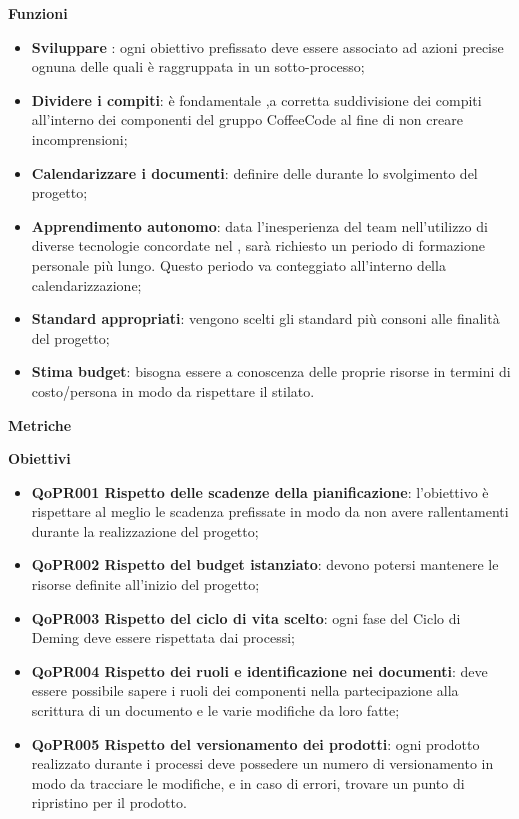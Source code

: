 \documentclass[../piano-di-qualifica.tex]{subfiles}
\begin{document}
\textbf{Funzioni}

\begin{itemize}
    \item \textbf{Sviluppare }: ogni obiettivo prefissato deve essere associato ad azioni precise ognuna delle quali è raggruppata in un sotto-processo;
    \item \textbf{Dividere i compiti}: è fondamentale ,a corretta suddivisione dei compiti all'interno dei componenti del gruppo CoffeeCode al fine di non creare incomprensioni;
    \item \textbf{Calendarizzare i documenti}: definire delle  durante lo svolgimento del progetto;
    \item \textbf{Apprendimento autonomo}: data l'inesperienza del team nell'utilizzo di diverse tecnologie concordate nel , sarà richiesto un periodo di formazione personale più lungo. Questo periodo va conteggiato all'interno della calendarizzazione;
    \item \textbf{Standard appropriati}: vengono scelti gli standard più consoni alle finalità del progetto;
    \item \textbf{Stima budget}: bisogna essere a conoscenza delle proprie risorse in termini di costo/persona in modo da rispettare il  stilato.
\end{itemize}

\textbf{Metriche}

\textbf{Obiettivi}
\begin{itemize}
    \item \textbf{QoPR001 Rispetto delle scadenze della pianificazione}: l'obiettivo è rispettare al meglio le scadenza prefissate in modo da non avere rallentamenti durante la realizzazione del progetto;
    \item \textbf{QoPR002 Rispetto del budget istanziato}: devono potersi mantenere le risorse definite all'inizio del progetto;
    \item \textbf{QoPR003 Rispetto del ciclo di vita scelto}: ogni fase del Ciclo di Deming deve essere rispettata dai processi;
    \item \textbf{QoPR004 Rispetto dei ruoli e identificazione nei documenti}: deve essere possibile sapere i ruoli dei componenti nella partecipazione alla scrittura di un documento e le varie modifiche da loro fatte;
    \item \textbf{QoPR005 Rispetto del versionamento dei prodotti}: ogni prodotto realizzato durante i processi deve possedere un numero di versionamento in modo da tracciare le modifiche, e in caso di errori, trovare un punto di ripristino per il prodotto.
\end{itemize}
\end{document}
